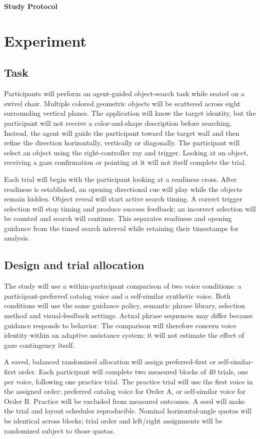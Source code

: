 \documentclass[11pt,letterpaper]{article}
\begin{document}
{\LARGE\bfseries Study Protocol}\par
\section{Experiment}
\subsection{Task}
Participants will perform an agent-guided object-search task while seated on a swivel chair. Multiple colored geometric objects will be scattered across eight surrounding vertical planes. The application will know the target identity, but the participant will not receive a color-and-shape description before searching. Instead, the agent will guide the participant toward the target wall and then refine the direction horizontally, vertically or diagonally. The participant will select an object using the right-controller ray and trigger. Looking at an object, receiving a gaze confirmation or pointing at it will not itself complete the trial.

Each trial will begin with the participant looking at a readiness cross. After readiness is established, an opening directional cue will play while the objects remain hidden. Object reveal will start active search timing. A correct trigger selection will stop timing and produce success feedback; an incorrect selection will be counted and search will continue. This separates readiness and opening guidance from the timed search interval while retaining their timestamps for analysis.

\subsection{Design and trial allocation}
The study will use a within-participant comparison of two voice conditions: a participant-preferred catalog voice and a self-similar synthetic voice. Both conditions will use the same guidance policy, semantic phrase library, selection method and visual-feedback settings. Actual phrase sequences may differ because guidance responds to behavior. The comparison will therefore concern voice identity within an adaptive assistance system; it will not estimate the effect of gaze contingency itself.

A saved, balanced randomized allocation will assign preferred-first or self-similar-first order. Each participant will complete two measured blocks of 40 trials, one per voice, following one practice trial. The practice trial will use the first voice in the assigned order: preferred catalog voice for Order A, or self-similar voice for Order B. Practice will be excluded from measured outcomes. A seed will make the trial and layout schedules reproducible. Nominal horizontal-angle quotas will be identical across blocks; trial order and left/right assignments will be randomized subject to those quotas.
\end{document}
